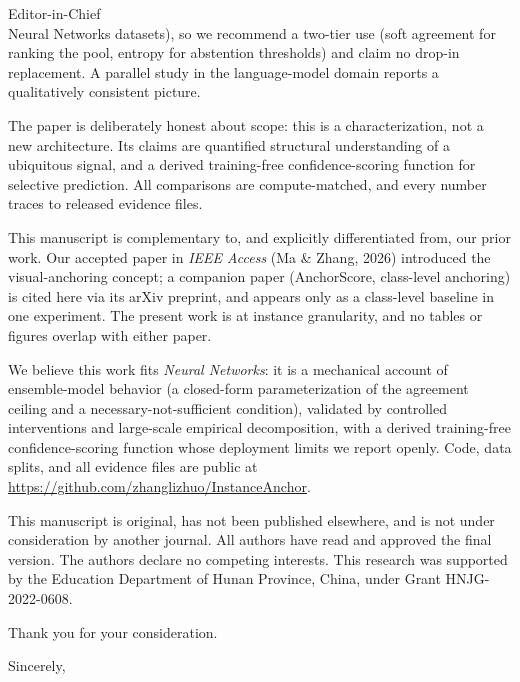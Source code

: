 \documentclass[10pt]{letter}
\begin{document}
\begin{letter}{Editor-in-Chief \\ Neural Networks}
datasets), so we recommend a two-tier use (soft agreement for ranking the pool, entropy for abstention thresholds) and claim no drop-in replacement. A parallel study in the language-model domain reports a qualitatively consistent picture.

The paper is deliberately honest about scope: this is a characterization, not a new architecture. Its claims are quantified structural understanding of a ubiquitous signal, and a derived training-free confidence-scoring function for selective prediction. All comparisons are compute-matched, and every number traces to released evidence files.

This manuscript is complementary to, and explicitly differentiated from, our prior work. Our accepted paper in \emph{IEEE Access} (Ma \& Zhang, 2026) introduced the visual-anchoring concept; a companion paper (AnchorScore, class-level anchoring) is cited here via its arXiv preprint, and appears only as a class-level baseline in one experiment. The present work is at instance granularity, and no tables or figures overlap with either paper.

We believe this work fits \emph{Neural Networks}: it is a mechanical account of ensemble-model behavior (a closed-form parameterization of the agreement ceiling and a necessary-not-sufficient condition), validated by controlled interventions and large-scale empirical decomposition, with a derived training-free confidence-scoring function whose deployment limits we report openly. Code, data splits, and all evidence files are public at \url{https://github.com/zhanglizhuo/InstanceAnchor}.

This manuscript is original, has not been published elsewhere, and is not under consideration by another journal. All authors have read and approved the final version. The authors declare no competing interests. This research was supported by the Education Department of Hunan Province, China, under Grant HNJG-2022-0608.

Thank you for your consideration.

\closing{Sincerely,}

\end{letter}
\end{document}
